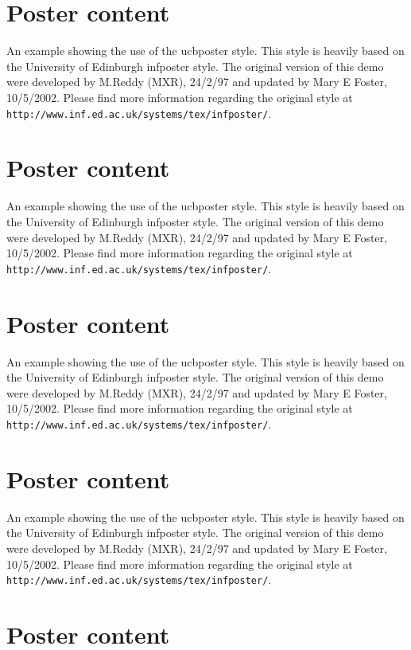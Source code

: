 \documentclass{ucbposter}
\begin{document}
\section{Poster content}

An example showing the use of the ucbposter style. This style is
heavily based on the University of Edinburgh infposter style. The
original version of this demo were developed by M.Reddy (MXR), 24/2/97
and updated by Mary E Foster, 10/5/2002. Please find more information
regarding the original style at {\tt
http://www.inf.ed.ac.uk/systems/tex/infposter/}.

\section{Poster content}

An example showing the use of the ucbposter style. This style is
heavily based on the University of Edinburgh infposter style. The
original version of this demo were developed by M.Reddy (MXR), 24/2/97
and updated by Mary E Foster, 10/5/2002. Please find more information
regarding the original style at {\tt
http://www.inf.ed.ac.uk/systems/tex/infposter/}.

\section{Poster content}

An example showing the use of the ucbposter style. This style is
heavily based on the University of Edinburgh infposter style. The
original version of this demo were developed by M.Reddy (MXR), 24/2/97
and updated by Mary E Foster, 10/5/2002. Please find more information
regarding the original style at {\tt
http://www.inf.ed.ac.uk/systems/tex/infposter/}.

\section{Poster content}

An example showing the use of the ucbposter style. This style is
heavily based on the University of Edinburgh infposter style. The
original version of this demo were developed by M.Reddy (MXR), 24/2/97
and updated by Mary E Foster, 10/5/2002. Please find more information
regarding the original style at {\tt
http://www.inf.ed.ac.uk/systems/tex/infposter/}.

\section{Poster content}
\end{document}
